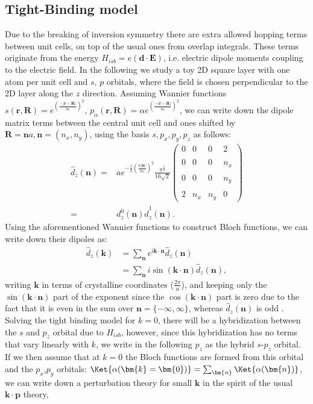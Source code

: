 \subsection{Tight-Binding model}
Due to the breaking of inversion symmetry there are extra allowed hopping terms between unit cells, on top of the usual ones from overlap integrals. These terms originate from the energy $H_{isb} = e (\bm{d}\cdot \bm{E})$, i.e. electric dipole moments coupling to the electric field. In the following we study a toy 2D square layer with one atom per unit cell and $s$, $p$ orbitals, where the field is chosen perpendicular to the 2D layer along the $z$ direction. Assuming Wannier functions $s(\bm{r},\bm{R}) = e^{\left(\frac{-|\bm{r}-\bm{R}|}{a_0}\right)^2}$, $p_\alpha(\bm{r},\bm{R}) = \alpha e^{\left(\frac{-|\bm{r}-\bm{R}|}{a_0}\right)^2}$, we can write down the dipole matrix terms between the central unit cell and ones shifted by $\bm{R}=\bm{n}a, \bm{n}=(n_x,n_y)$, using the basis $s, p_x, p_y, p_z$ as follows:
\begin{align}
	\label{eq:dipole}
	\hat{d}_z(\bm{n}) =& ae^{-\frac{1}{2}\left(\frac{a|\bm{n}|}{a_0}\right)^2}\frac{\pi^{\frac{3}{2}}}{16\sqrt{2}}\left(\begin{matrix}0&0&0&2\\\\0&0&0&n_x\\\\0&0&0&n_y\\\\2&n_x&n_y&0\end{matrix}\right)\\
	=&d_z^0(\bm{n})\hat{d}^1_z(\bm{n}).
\end{align}
Using the aforementioned Wannier functions to construct Bloch functions, we can write down their dipoles as:
\begin{align}
	\hat{d}_z(\bm{k}) &= \sum_{\bm{n}} e^{i \bm{k}\cdot \bm{n}}\hat{d}_z(\bm{n})\\
	&=\sum_{\bm{n}}i \sin(\bm{k}\cdot\bm{n}) \hat{d}_z(\bm{n}),
\end{align}
writing $\bm{k}$ in terms of crystalline coordinates ($\frac{2\pi}{a}$), and keeping only the $\sin(\bm{k}\cdot\bm{n})$ part of the exponent since the $\cos(\bm{k}\cdot\bm{n})$ part is zero due to the fact that it is even in the sum over $\bm{n} = \{-\infty, \infty\}$, whereas $\hat{d}_z(\bm{n})$ is odd . Solving the tight binding model for $k=0$, there will be a hybridization between the $s$ and $p_z$ orbital due to $H_{isb}$, however, since this hybridization has no terms that vary linearly with $k$, we write in the following $p_z$ as the hybrid $s$-$p_z$ orbital. If we then assume that at $k=0$ the Bloch functions are formed from this orbital and the $p_x$,$p_y$ orbitals: $\Ket{\alpha(\bm{k}=\bm{0})} = \sum_{\bm{n}} \Ket{\alpha(\bm{n})}$, we can write down a perturbation theory for small $\bm{k}$ in the spirit of the usual $\bm{k}\cdot\bm{p}$ theory,

